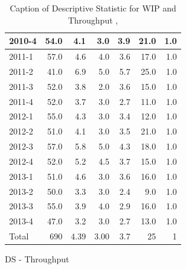 \documentclass[UKenglish]{ifimaster}  %
\begin{document}
\begin{appendices}
\begin{table}[!htbp]
\begin{adjustwidth}{-2.5cm}{}
\begin{subfigure}[b]{0.3\textwidth}
{\begin{tabular}{ | l | r | r | r | r | r | r | }
2010-4 & 54.0 & 4.1 & 3.0 & 3.9 & 21.0 & 1.0\\ \hline
2011-1 & 57.0 & 4.6 & 4.0 & 3.6 & 17.0 & 1.0\\ \hline
2011-2 & 41.0 & 6.9 & 5.0 & 5.7 & 25.0 & 1.0\\ \hline
2011-3 & 52.0 & 3.8 & 2.0 & 3.6 & 15.0 & 1.0\\ \hline
2011-4 & 52.0 & 3.7 & 3.0 & 2.7 & 11.0 & 1.0\\ \hline
2012-1 & 55.0 & 4.3 & 3.0 & 3.4 & 12.0 & 1.0\\ \hline
2012-2 & 51.0 & 4.1 & 3.0 & 3.5 & 21.0 & 1.0\\ \hline
2012-3 & 57.0 & 5.8 & 5.0 & 4.3 & 18.0 & 1.0\\ \hline
2012-4 & 52.0 & 5.2 & 4.5 & 3.7 & 15.0 & 1.0\\ \hline
2013-1 & 51.0 & 4.6 & 3.0 & 3.6 & 16.0 & 1.0\\ \hline
2013-2 & 50.0 & 3.3 & 3.0 & 2.4 & 9.0 & 1.0\\ \hline
2013-3 & 55.0 & 3.9 & 4.0 & 2.9 & 16.0 & 1.0\\ \hline
2013-4 & 47.0 & 3.2 & 3.0 & 2.7 & 13.0 & 1.0\\ \hline
Total&690&4.39&3.00&3.7&25&1\\ \hline

\end{tabular}
}
\caption{DS - Throughput}
 \label{DS:Throughput:2}
\end{subfigure}
\end{adjustwidth}
\caption[Optional caption for list of figures]{Caption of Descriptive Statistic for WIP and Throughput  , }
\label{DS:2:1} %
\end{table}




\end{appendices}
\end{document}
